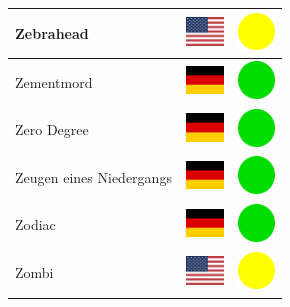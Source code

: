 \documentclass[12pt, a4paper, twoside]{report}
\begin{document}
\begin{center}
\begin{longtable}{|p{5cm}|p{2cm}|p{2cm}|}
 Zebrahead                                                  & \includegraphics[width=1cm]{../img/flags/us} &   \includegraphics[width=1cm]{../likes/m} \\ \hline
 Zementmord                                                 & \includegraphics[width=1cm]{../img/flags/de} &   \includegraphics[width=1cm]{../likes/y} \\ \hline
 Zero Degree                                                & \includegraphics[width=1cm]{../img/flags/de} &   \includegraphics[width=1cm]{../likes/y} \\ \hline
 Zeugen eines Niedergangs                                   & \includegraphics[width=1cm]{../img/flags/de} &   \includegraphics[width=1cm]{../likes/y} \\ \hline
 Zodiac                                                     & \includegraphics[width=1cm]{../img/flags/de} &   \includegraphics[width=1cm]{../likes/y} \\ \hline
 Zombi                                                      & \includegraphics[width=1cm]{../img/flags/us} &   \includegraphics[width=1cm]{../likes/m} \\ \hline
		\end{longtable}
	\end{center}
\end{document}
